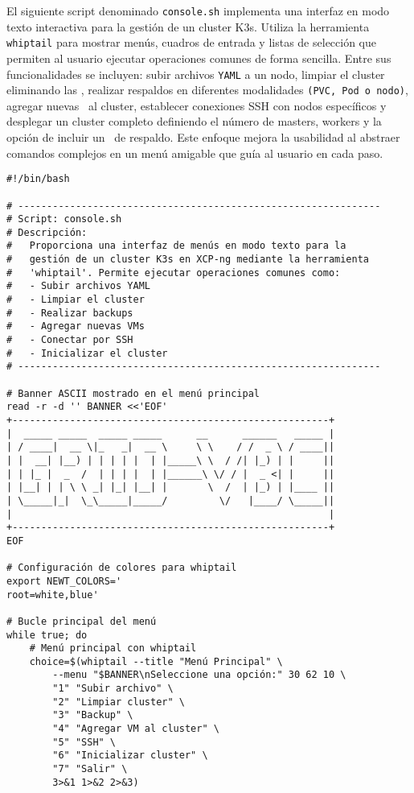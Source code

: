 El siguiente script denominado \texttt{console.sh} implementa una interfaz en modo texto interactiva para la gestión de un cluster K3s. Utiliza la herramienta \texttt{whiptail} para mostrar menús, cuadros de entrada y listas de selección que permiten al usuario ejecutar operaciones comunes de forma sencilla. Entre sus funcionalidades se incluyen: subir archivos \texttt{YAML} a un nodo, limpiar el cluster eliminando las \VM, realizar respaldos en diferentes modalidades \texttt{(PVC, Pod o nodo)}, agregar nuevas \VM\ al cluster, establecer conexiones SSH con nodos específicos y desplegar un cluster completo definiendo el número de masters, workers y la opción de incluir un \NAT\ de respaldo. Este enfoque mejora la usabilidad al abstraer comandos complejos en un menú amigable que guía al usuario en cada paso.

\begin{verbatim}
#!/bin/bash

# ---------------------------------------------------------------
# Script: console.sh
# Descripción:
#   Proporciona una interfaz de menús en modo texto para la 
#   gestión de un cluster K3s en XCP-ng mediante la herramienta
#   'whiptail'. Permite ejecutar operaciones comunes como:
#   - Subir archivos YAML
#   - Limpiar el cluster
#   - Realizar backups
#   - Agregar nuevas VMs
#   - Conectar por SSH
#   - Inicializar el cluster
# ---------------------------------------------------------------

# Banner ASCII mostrado en el menú principal
read -r -d '' BANNER <<'EOF'
+-------------------------------------------------------+
|  _____ _____  _____ _____      __      ______   _____ |
| / ____|  __ \|_   _|  __ \     \ \    / /  _ \ / ____||
| |  __| |__) | | | | |  | |_____\ \  / /| |_) | |     ||
| | |_ |  _  /  | | | |  | |______\ \/ / |  _ <| |     ||
| |__| | | \ \ _| |_| |__| |       \  /  | |_) | |____ ||
| \_____|_|  \_\_____|_____/         \/   |____/ \_____||
|                                                       |
+-------------------------------------------------------+
EOF

# Configuración de colores para whiptail
export NEWT_COLORS='
root=white,blue'

# Bucle principal del menú
while true; do
    # Menú principal con whiptail
    choice=$(whiptail --title "Menú Principal" \
        --menu "$BANNER\nSeleccione una opción:" 30 62 10 \
        "1" "Subir archivo" \
        "2" "Limpiar cluster" \
        "3" "Backup" \
        "4" "Agregar VM al cluster" \
        "5" "SSH" \
        "6" "Inicializar cluster" \
        "7" "Salir" \
        3>&1 1>&2 2>&3)


\end{verbatim}
